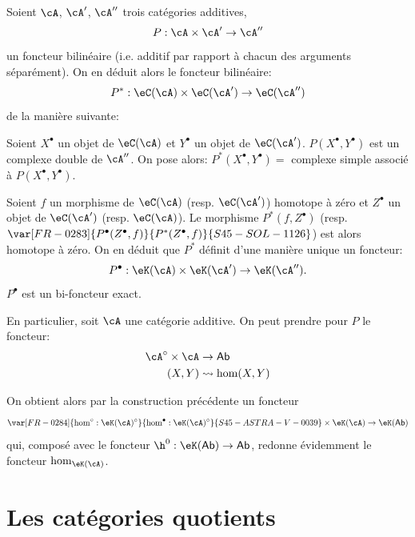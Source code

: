 Soient $\cA$, $\cA'$, $\cA''$ trois catégories additives, 
\[
  P:\cA\times \cA'\to \cA''
\]
un foncteur bilinéaire (i.e. additif par rapport à chacun des arguments 
séparément). On en déduit alors le foncteur bilinéaire: 
\[
  P^\ast:\eC(\cA)\times \eC(\cA') \to \eC(\cA'') 
\]
de la manière suivante: 

Soient $X^\bullet$ un objet de $\eC(\cA)$ et $Y^\bullet$ un objet de 
$\eC(\cA')$. $P(X^\bullet,Y^\bullet)$ est un complexe double de $\cA''$. On 
pose alors: $P^\ast(X^\bullet,Y^\bullet) = $ complexe simple associé à 
$P(X^\bullet,Y^\bullet)$. 

Soient $f$ un morphisme de $\eC(\cA)$ (resp. $\eC(\cA')$) homotope à zéro 
et $Z^\bullet$ un objet de $\eC(\cA')$ (resp. $\eC(\cA)$). Le morphisme 
$P^\ast(f,Z^\bullet)$ (resp. $\var[FR-0283]{P^\bullet(Z^\bullet,f)}{P^\ast(Z^\bullet,f)}{S45-SOL-1126}$) est alors homotope à 
zéro. On en déduit que $P^\ast$ définit d'une manière unique un 
foncteur: 
\[
  P^\bullet:\eK(\cA) \times \eK(\cA') \to \eK(\cA'') \text{.}
\]
$P^\bullet$ est un bi-foncteur exact. 

En particulier, soit $\cA$ une catégorie additive. On peut prendre pour $P$ le 
foncteur: 
\begin{align*}
  \cA^\circ\times \cA &\to \mathsf{Ab} \\
  (X,Y) &\leadsto \hom(X,Y) 
\end{align*}

On obtient alors par la construction précédente un foncteur 
\[
  \var[FR-0284]{\hom^\circ:\eK(\cA)^\circ}{\hom^\bullet:\eK(\cA)^\circ}{S45-ASTRA-V-0039} \times \eK(\cA) \to \eK(\mathsf{Ab}) 
\]
qui, composé avec le foncteur $\h^0:\eK(\mathsf{Ab})\to \mathsf{Ab}$, 
redonne évidemment le foncteur $\hom_{\eK(\cA)}$. 




















\section{Les catégories quotients}\label{VIII:2}










